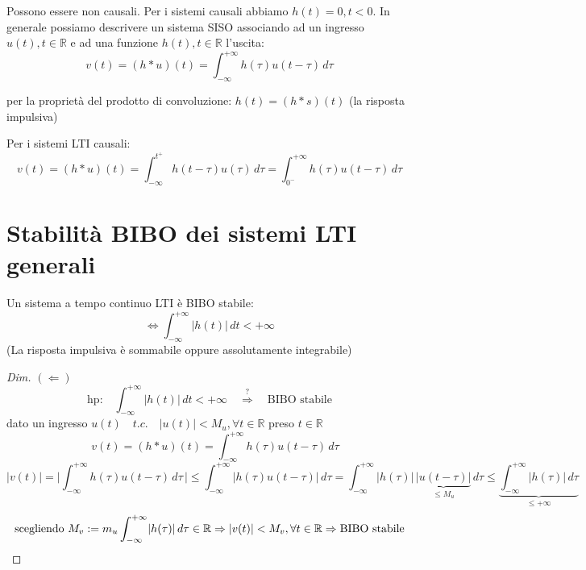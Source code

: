 Possono essere non causali.
Per i sistemi causali abbiamo $h(t) =0, t<0$.
In generale possiamo descrivere un sistema SISO associando ad un ingresso $u(t), t \in \mathbb{R}$ e ad una funzione $h(t), t \in \mathbb{R}$ l'uscita:
\begin{equation}
	v(t)=(h*u)(t) = \int_{-\infty}^{+\infty}h(\tau)u(t-\tau)\,d\tau
	\tag{10}\label{equation 10}
\end{equation}

\begin{osservazione}
	per la proprietà del prodotto di convoluzione: $h(t)=(h*s)(t)$ (la risposta impulsiva) %
\end{osservazione}

Per i sistemi LTI causali:
\[
	v(t)=(h*u)(t) = \int_{-\infty}^{t^+}h(t-\tau)u(\tau)\,d\tau = \int_{0^-}^{+\infty}h(\tau)u(t-\tau)\,d\tau
\]


\section{Stabilità BIBO dei sistemi LTI generali}




Un sistema a tempo continuo LTI è BIBO stabile:
\[
	\Leftrightarrow \int_{-\infty}^{+\infty}\lvert h(t) \rvert \,dt < +\infty
\]
(La risposta impulsiva è sommabile oppure assolutamente integrabile)

\begin{proof}[Dim]
	\emph{$(\Leftarrow)$}
	\[
		\text{hp:} \quad \int_{-\infty}^{+\infty}\lvert h(t) \rvert \,dt < +\infty \quad \overset{?}{\Rightarrow} \quad \text{BIBO stabile}
	\]	
	dato un ingresso $u(t) \quad t.c.\quad \lvert u(t) \rvert < M_u , \forall t \in \mathbb{R}$ preso $t \in \mathbb{R}$ 
	\[
		\quad v(t)=(h*u)(t) = \int_{-\infty}^{+\infty}h(\tau)u(t-\tau)\,d\tau 
	\]
	\[
		\lvert v(t) \rvert 
		= \bigg\lvert \int_{-\infty}^{+\infty}h(\tau)u(t-\tau)\,d\tau \,  \bigg\rvert
		\le \int_{-\infty}^{+\infty} \rvert h(\tau)u(t-\tau) \lvert\,d\tau
		= \int_{-\infty}^{+\infty} \rvert h(\tau) \lvert \, \underbrace{\rvert u(t-\tau) \lvert}_{\le M_u} \,d\tau
		\le \underbrace{\int_{-\infty}^{+\infty} \rvert h(\tau)\lvert\,d\tau}_{\le + \infty}
	\]
	\[
		\text{scegliendo } M_v := m_u \int_{-\infty}^{+\infty} \rvert h(\tau)\lvert\,d\tau \in \mathbb{R} \Rightarrow \lvert v(t) \rvert < M_v, \forall t \in \mathbb{R}\Rightarrow \text{BIBO stabile} \qedhere
	\]
\end{proof}


